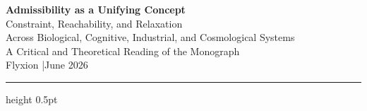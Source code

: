\documentclass[12pt, a4paper]{article}
\theoremstyle{definition}
\begin{document}
\begin{center}
  {\LARGE\bfseries\color{deepblue}
   Admissibility as a Unifying Concept}\\[0.7em]
  {\large\color{dimgray}
   Constraint, Reachability, and Relaxation\\
   Across Biological, Cognitive, Industrial, and Cosmological Systems}\\[0.9em]
  {\normalsize\color{dimgray}
   A Critical and Theoretical Reading of the Monograph}\\[0.4em]
  {\small\color{dimgray!80} Flyxion \quad|\quad June 2026}
\end{center}

\vspace{0.8em}
{\color{rulingblue!40}\hrule height 0.5pt}
\vspace{1.6em}
\end{document}
